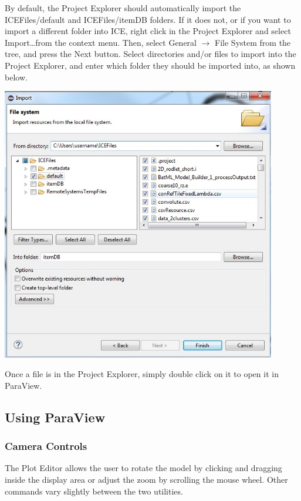 By default, the Project Explorer should automatically import the
ICEFiles/default and ICEFiles/itemDB folders. If it does not, or if you want to
import a different folder into ICE, right click in the Project Explorer and
select Import\ldots from the context menu. Then, select General $\rightarrow$
File System from the tree, and press the Next button. Select directories and/or
files to import into the Project Explorer, and enter which folder they should
be imported into, as shown below.

\begin{center}
\includegraphics[width=12cm]{images/ImportFileDialog}
\end{center}

Once a file is in the Project Explorer, simply double click on it to open it in
ParaView.

\subsection{Using ParaView}

\subsubsection{Camera Controls}

The Plot Editor allows the user to rotate the model by clicking and dragging
inside the display area or adjust the zoom by scrolling the mouse wheel. Other
commands vary slightly between the two utilities.

